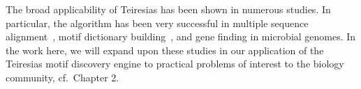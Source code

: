             The broad applicability of Teiresias has been shown in
            numerous studies.  In particular, the algorithm has
            been very successful in multiple sequence
            alignment~\cite{parida1998musca}, motif dictionary
            building~\cite{rigoutsos1999dictionary}, and gene
            finding in microbial
            genomes.  In the work
            here, we will expand upon these studies in our
            application of the Teiresias motif discovery
            engine to practical problems of interest to the biology
            community, cf.\ Chapter 2.

